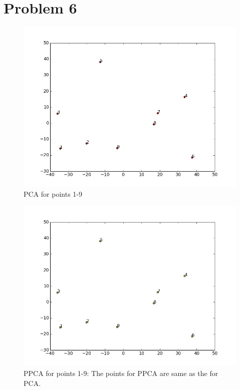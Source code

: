 \documentclass[10pt,onecolumn,letterpaper]{article}
\begin{document}
\section{Problem 6}

\begin{figure}[ht!]
\centering
\includegraphics[width=120mm]{figure_1.jpg}
\caption{PCA for points 1-9 \label{overflow}}
\end{figure}

\begin{figure}[ht!]
\centering
\includegraphics[width=120mm]{figure_2.jpg}
\caption{PPCA for points 1-9: The points for PPCA are same as the for PCA. \label{overflow}}
\end{figure}
\end{document}
